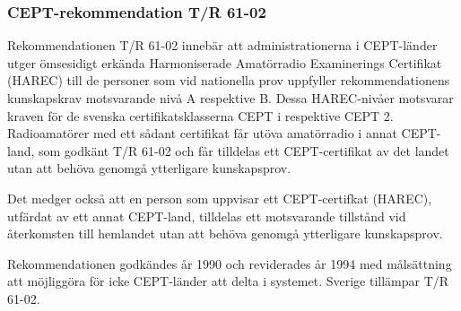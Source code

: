 \subsubsection{CEPT-rekommendation T/R 61-02}

Rekommendationen T/R 61-02 innebär att administrationerna i
CEPT-länder utger ömsesidigt erkända Harmoniserade Amatörradio
Examinerings Certifikat (HAREC) till de personer som vid nationella
prov uppfyller rekommendationens kunskapskrav motsvarande nivå A
respektive B. Dessa HAREC-nivåer motsvarar kraven för de svenska
certifikatsklasserna CEPT i respektive CEPT 2. Radioamatörer med ett
sådant certifikat får utöva amatörradio i annat CEPT-land, som godkänt
T/R 61-02 och får tilldelas ett CEPT-certifikat av det landet utan att
behöva genomgå ytterligare kunskapsprov.

Det medger också att en person som uppvisar ett CEPT-certifkat
(HAREC), utfärdat av ett annat CEPT-land, tilldelas ett motsvarande
tillstånd vid återkomsten till hemlandet utan att behöva genomgå
ytterligare kunskapsprov.

Rekommendationen godkändes år 1990 och reviderades år 1994 med
målsättning att möjliggöra för icke CEPT-länder att delta i systemet.
Sverige tillämpar T/R 61-02.



